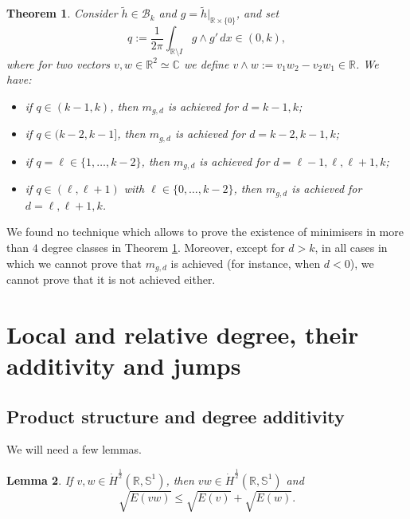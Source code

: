 \documentclass[12pt, a4paper]{article}
\newtheorem{thm}{Theorem}[section]
\newtheorem{lem}[thm]{Lemma}
\newtheorem{pb}{Open Question}
\newcommand{\M}[1]{\mathcal{#1}}
\newcommand{\sph}{\mathbb{S}}
\newcommand{\R}{\mathbb{R}}
\renewcommand{\(}{\left(}
\renewcommand{\)}{\right)}
\begin{document}
\begin{thm}\label{Bl3}  Consider $\tilde h\in\M B_k$ and $g=\tilde h|_{\R\times\{0\}}$,
and set
\[
q:=\frac1{2\pi}\int_{\R\setminus I} g\wedge g'\,dx\in (0,k),
\]
where for two vectors $v,w\in \R^2\simeq \mathbb{C}$ we define $v\wedge w:=v_1w_2-v_2w_1\in \R$.
We have:
\begin{itemize}
\item if $q\in (k-1,k)$, then $m_{g,d}$ is achieved for $d=k-1,k$;
\item if $q\in (k-2,k-1]$, then $m_{g,d}$ is achieved for $d=k-2,k-1,k$;
\item if $q=\ell \in\{1,\dots, k-2\}$, then $m_{g,d}$ is achieved for $d=\ell-1,\ell,\ell+1,k$;
\item if $q\in (\ell,\ell+1)$ with $\ell\in \{0,\dots, k-2\}$, then $m_{g,d}$ is achieved for $d=\ell,\ell+1,k$.
\end{itemize}
\end{thm}

We found no technique which allows to prove the existence of minimisers in more than $4$ degree classes in Theorem \ref{Bl3}. Moreover, except for $d>k$, in all cases in which we cannot prove that $m_{g,d}$ is achieved (for instance, when $d<0$), we cannot prove that it is not achieved either.





\section{Local and relative degree, their additivity and jumps}

\subsection{Product structure and degree additivity}

We will need a few lemmas.

\begin{lem}\label{product}
If $v,w\in\dot H^{\frac12}(\R,\sph^1)$, then $vw\in\dot H^{\frac12}(\R,\sph^1)$ and
\begin{equation}\label{Evw}
\sqrt{E(vw)}\le \sqrt{E(v)}+\sqrt{E(w)}.
\end{equation}
\end{lem}
\end{document}
